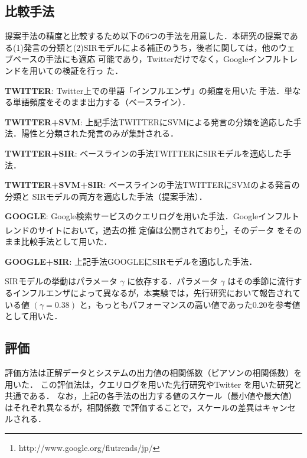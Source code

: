 \documentclass[japanese]{jnlp_1.4}
\begin{document}
\subsection{比較手法}

提案手法の精度と比較するため以下の6つの手法を用意した．本研究の提案であ
る(1)発言の分類と(2)SIRモデルによる補正のうち，後者に関しては，他のウェブベースの手法にも適応
可能であり，Twitterだけでなく，Googleインフルトレンドを用いての検証を行っ
た．

\begin{description}
\item {\bf TWITTER}: Twitter上での単語「インフルエンザ」の頻度を用いた
  手法．単なる単語頻度をそのまま出力する（ベースライン）．
\item  {\bf TWITTER+SVM}: 上記手法TWITTERにSVMによる発言の分類を適応した手法．陽性と分類された発言のみが集計される．
\item  {\bf TWITTER+SIR}: ベースラインの手法TWITTERにSIRモデルを適応した手法．
\item  {\bf TWITTER+SVM+SIR}: ベースラインの手法TWITTERにSVMのよる発言の分類と
SIRモデルの両方を適応した手法（提案手法）．
\item {\bf GOOGLE}: Google検索サービスのクエリログを用いた手法\cite{Ginsberg2009}．Googleインフルトレンドのサイトにおいて，過去の推
  定値は公開されており\footnote{http://www.google.org/flutrends/jp/}，そのデータ
  をそのまま比較手法として用いた．
\item  {\bf GOOGLE+SIR}: 上記手法GOOGLEにSIRモデルを適応した手法．
\end{description}

SIRモデルの挙動はパラメータ $\gamma$ に依存する．パラメータ $\gamma$ はその季節に流行す
るインフルエンザによって異なるが，本実験では，先行研究\cite{Anderson1979}において報告されている値 $(\gamma=0.38)$ と，もっともパフォーマンスの高い値であった0.20を参考値として用いた．


\subsection{評価}

評価方法は正解データとシステムの出力値の相関係数（ピアソンの相関係数）を用いた．
この評価法は，クエリログを用いた先行研究\cite{Ginsberg2009}やTwitter
を用いた研究\cite{Aramaki2011}と共通である．
なお，上記の各手法の出力する値のスケール（最小値や最大値）はそれぞれ異なるが，相関係数
で評価することで，スケールの差異はキャンセルされる．
\end{document}
